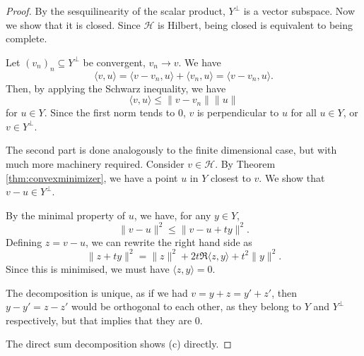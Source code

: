 \documentclass[twoside,symmetric, openany, 12pt]{./tuftebook}
\theoremstyle{definition}
\theoremstyle{definition}
\theoremstyle{definition}
\begin{document}
\begin{proof}
	By the sesquilinearity of the scalar product, $Y^\perp$ is a vector subspace. Now we show that it is closed. Since $\mathcal{H}$ is Hilbert, being closed is equivalent to being complete.

	Let $(v_n)_n\subseteq Y^\perp$ be convergent, $v_n\to v$. We have
	\[
	\langle v, u\rangle = \langle v - v_n, u\rangle + \langle v_n, u\rangle = \langle v - v_n, u\rangle
	.\] 
	Then, by applying the Schwarz inequality, we have
	\[
	\langle v, u \rangle \le \|v - v_n\|\|u\|
	\]
	for $u\in Y$. Since the first norm tends to $0$, $v$ is perpendicular to $u$ for all $u\in Y$, or $v\in Y^\perp$. 

	The second part is done analogously to the finite dimensional case, but with much more machinery required. Consider $v\in \mathcal{H}$. By Theorem \ref{thm:convexminimizer}, we have a point $u$ in $Y$ closest to $v$. We show that $v-u\in Y^\perp$.  

	By the minimal property of $u$, we have, for any $y\in Y$,
	\[
	\|v - u\|^2 \le \|v - u + ty\|^2
	.\] 
	Defining $z=v-u$, we can rewrite the right hand side as
	\[
	\|z + ty\|^2= \|z\|^2 + 2t \Re \langle z, y\rangle + t^2 \|y\|^2
	.\] 
	Since this is minimised, we must have $\langle z, y\rangle = 0$.

	The decomposition is unique, as if we had $v = y + z = y' + z'$, then $y-y'=z-z'$ would be orthogonal to each other, as they belong to $Y$ and $Y^\perp$ respectively, but that implies that they are 0.

	The direct sum decomposition shows (c) directly.
\end{proof}
\end{document}
